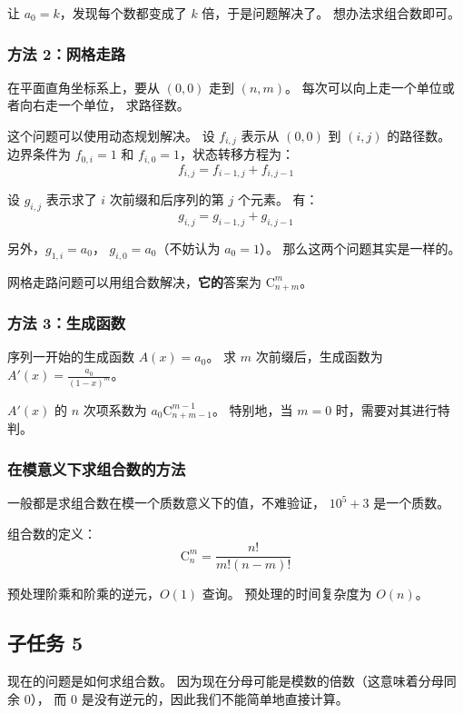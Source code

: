 \documentclass[UTF8]{article}
\begin{document}
	让 $a_0 = k$，发现每个数都变成了 $k$ 倍，于是问题解决了。
	想办法求组合数即可。

	\subsubsection{方法 2：网格走路}

	在平面直角坐标系上，要从 $(0, 0)$ 走到 $(n, m)$。
	每次可以向上走一个单位或者向右走一个单位，
	求路径数。

	这个问题可以使用动态规划解决。
	设 $f_{i, j}$ 表示从 $(0, 0)$ 到 $(i, j)$ 的路径数。
	边界条件为 $f_{0, i} = 1$ 和 $f_{i, 0} = 1$，状态转移方程为：
	$$
	f_{i, j} = f_{i - 1, j} + f_{i, j - 1}
	$$

	\bigskip

	设 $g_{i, j}$ 表示求了 $i$ 次前缀和后序列的第 $j$ 个元素。
	有：
	$$
	g_{i, j} = g_{i - 1, j} + g_{i, j - 1}
	$$

	另外，$g_{1, i} = a_0$，
	$g_{i, 0} = a_0$（不妨认为 $a_0 = 1$）。
	那么这两个问题其实是一样的。

	网格走路问题可以用组合数解决，\textbf{它的}答案为 $\mathrm{C}_{n + m}^{m}$。

	\subsubsection{方法 3：生成函数}

	序列一开始的生成函数 $A(x) = a_0$。
	求 $m$ 次前缀后，生成函数为 $A'(x) = \frac {a_0} {(1 - x)^m}$。

	$A'(x)$ 的 $n$ 次项系数为 $a_0 \mathrm{C}_{n + m - 1}^{m - 1}$。
	特别地，当 $m = 0$ 时，需要对其进行特判。

	\subsubsection{在模意义下求组合数的方法}

	一般都是求组合数在模一个质数意义下的值，不难验证，
	$10^5 + 3$ 是一个质数。

	组合数的定义：
	$$
	\mathrm{C}_{n}^{m} = \frac {n!} {m! (n - m)!}
	$$

	预处理阶乘和阶乘的逆元，$O(1)$ 查询。
	预处理的时间复杂度为 $O(n)$。

	\subsection{子任务 5}

	现在的问题是如何求组合数。
	因为现在分母可能是模数的倍数（这意味着分母同余 $0$），
	而 $0$ 是没有逆元的，因此我们不能简单地直接计算。
\end{document}
